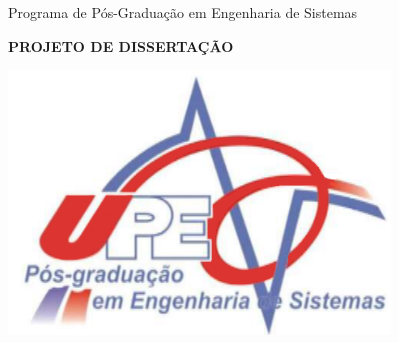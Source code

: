 \begin{titlepage}



\begin{figure}[h]
{}
\qquad \quad \quad \quad \quad \quad \quad
{}
\qquad \quad \quad \quad \quad \quad \quad
{}
\end{figure}

\begin{center}

{\Large Programa de Pós-Graduação em Engenharia de Sistemas} \\ \vspace{1ex}

\vspace{1.0in}

{\Large \textbf{PROJETO DE DISSERTAÇÃO}}

\vspace{0.1in}

\includegraphics[height=70mm]{Figuras/Capa/logo_ppges3.png}


\end{center}
\end{titlepage}
